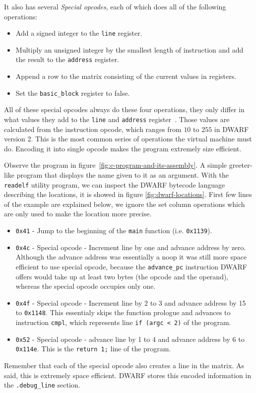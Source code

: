 It also has several \textit{Special opcodes}, each of which does all of the
following operations:
\begin{itemize}
    \item Add a signed integer to the \texttt{line} register.
    \item Multiply an unsigned integer by the smallest length of instruction
        and add the result to the \texttt{address} register.
    \item Append a row to the matrix consisting of the current values in
        registers.
    \item Set the \texttt{basic\_block} register to false.
\end{itemize}
All of these special opcodes always do these four operations, they only differ
in what values they add to the \texttt{line} and \texttt{address}
register~\cite{dwarf}. Those values are calculated from the instruction opcode,
which ranges from $10$ to $255$ in DWARF version 2. This is the most common
series of operations the virtual machine must do. Encoding it into single
opcode makes the program extremely size efficient.

Observe the program in figure~\ref{fig:c-program-and-its-assembly}. A simple
greeter-like program that displays the name given to it as an argument. With
the \texttt{readelf} utility program, we can inspect the DWARF bytecode
language describing the locations, it is showed in figure
\ref{fig:dwarf-locations}. First few lines of the example are explained below,
we ignore the set column operations which are only used to make the location
more precise.
\begin{itemize}
    \item \texttt{0x41} - Jump to the beginning of the \texttt{main} function (i.e. \texttt{0x1139}).
    \item \texttt{0x4c} - Special opcode - Increment line by one and advance
        address by zero. Although the advance address was essentially a noop it
        was still more space efficient to use special opcode, because the
        \texttt{advance\_pc} instruction DWARF offers would take up at least
        two bytes (the opcode and the operand), whereas
        the special opcode occupies only one.
    \item \texttt{0x4f} - Special opcode - Increment line by 2 to 3 and advance address by 15 to \texttt{0x1148}.
        This essentialy skips the function prologue and advances to instruction \texttt{cmpl}, which represents
        line \texttt{if (argc < 2)} of the program.
    \item \texttt{0x52} - Special opcode - advance line by 1 to 4 and advance address by 6 to \texttt{0x114e}.
        This is the \texttt{return 1;} line of the program.
\end{itemize}
Remember that each of the special opcode also creates a line in the matrix. As
said, this is extremely space efficient. DWARF stores this encoded information
in the \verb|.debug_line| section.

